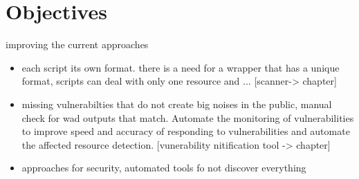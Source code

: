 \section{Objectives}
improving the current approaches
\begin{itemize}
\item each script its own format. there is a need for a wrapper that has a unique format, scripts can deal with only one resource and ... [scanner-> chapter]
\item missing vulnerabilties that do not create big noises in the public, manual check for wad outputs that match. Automate the monitoring of vulnerabilities to improve speed and accuracy of responding to vulnerabilities and automate the affected resource detection. [vunerability nitification tool -> chapter]

\item approaches for security, automated tools fo not discover everything
\end{itemize}

























